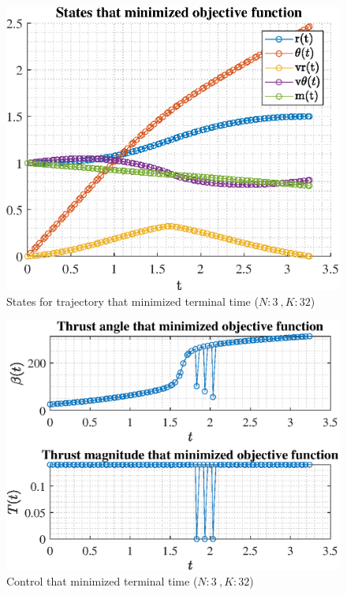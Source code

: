 \documentclass[]{article}
\begin{document}
\begin{figure}
	\centering
	\includegraphics[scale=0.75]{states_N3_K32_C3_tf.eps}
	\caption{States for trajectory that minimized terminal time (\(N:3\ , K:32\))}
	\label{fig:states_N3_K32_C3_tf}
\end{figure}
\begin{figure}
	\centering
	\includegraphics[scale=0.75]{control_N3_K32_C3_tf.eps}
	\caption{Control that minimized terminal time (\(N:3\ , K:32\))}
	\label{fig:control_N3_K32_C3_tf}
\end{figure}
\end{document}
